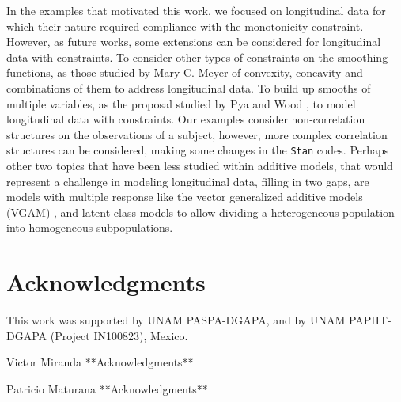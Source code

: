 \documentclass[11pt,letterpaper]{article}
\begin{document}

In the examples that motivated this work, we focused on longitudinal data for which their nature required compliance with the monotonicity constraint. 
However, as future works, some extensions can be considered for longitudinal data with constraints.
To consider other types of constraints on the smoothing functions,  as those studied by Mary C. Meyer \citep{Mey18,LiaMey19} of convexity, concavity and combinations of them to address longitudinal data.
To build up smooths of multiple variables, as the proposal studied by Pya and Wood \citep{PyaWoo15}, to model longitudinal data with constraints.
Our examples consider non-correlation structures on the observations of a  subject, however, more complex correlation structures can be considered, making some changes in the \texttt{Stan} codes.
Perhaps other two topics that have been less studied within additive models, that would represent a challenge in modeling longitudinal data, filling in two gaps, are models with multiple response like the vector generalized additive models (VGAM) \citep{Yee15},  and latent class models \cite{MutAsp09,ProPhiLiq17} to allow dividing a heterogeneous population into homogeneous subpopulations.





\section*{Acknowledgments}

This work was supported by UNAM PASPA-DGAPA, and by UNAM PAPIIT-DGAPA (Project IN100823), Mexico.

Victor Miranda **Acknowledgments**

Patricio Maturana **Acknowledgments**


\renewcommand\refname{Bibliograf\'ia}
\renewcommand\bibname{Bibliograf\'ia}
%

\end{document}
